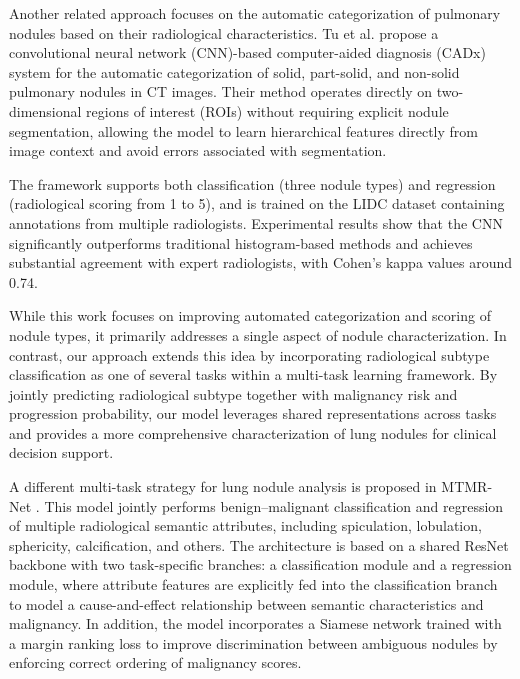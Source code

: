 \vspace{0.5cm}

Another related approach focuses on the automatic categorization of pulmonary nodules based on their radiological characteristics. Tu et al.\cite{tu2017} propose a convolutional neural network (CNN)-based computer-aided diagnosis (CADx) system for the automatic categorization of solid, part-solid, and non-solid pulmonary nodules in CT images. Their method operates directly on two-dimensional regions of interest (ROIs) without requiring explicit nodule segmentation, allowing the model to learn hierarchical features directly from image context and avoid errors associated with segmentation.

The framework supports both classification (three nodule types) and regression (radiological scoring from 1 to 5), and is trained on the LIDC dataset containing annotations from multiple radiologists. Experimental results show that the CNN significantly outperforms traditional histogram-based methods and achieves substantial agreement with expert radiologists, with Cohen's kappa values around 0.74.

While this work focuses on improving automated categorization and scoring of nodule types, it primarily addresses a single aspect of nodule characterization. In contrast, our approach extends this idea by incorporating radiological subtype classification as one of several tasks within a multi-task learning framework. By jointly predicting radiological subtype together with malignancy risk and progression probability, our model leverages shared representations across tasks and provides a more comprehensive characterization of lung nodules for clinical decision support.

\vspace{0.5cm}

A different multi-task strategy for lung nodule analysis is proposed in MTMR-Net \cite{Liu2020}. This model jointly performs benign–malignant classification and regression of multiple radiological semantic attributes, including spiculation, lobulation, sphericity, calcification, and others. The architecture is based on a shared ResNet backbone with two task-specific branches: a classification module and a regression module, where attribute features are explicitly fed into the classification branch to model a cause-and-effect relationship between semantic characteristics and malignancy. In addition, the model incorporates a Siamese network trained with a margin ranking loss to improve discrimination between ambiguous nodules by enforcing correct ordering of malignancy scores.

